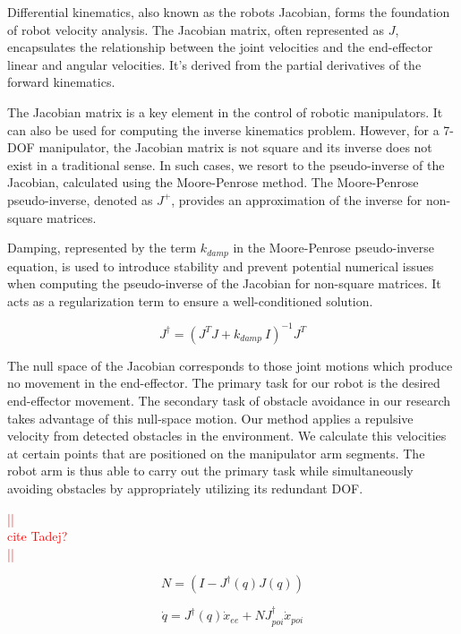 \documentclass[a4paper]{article}
\newcommand\todocomment[1]{\textcolor{red}{||\\ #1\\||}}
\begin{document}
Differential kinematics, also known as the robots Jacobian, forms the foundation of robot velocity analysis. The Jacobian matrix, often represented as $J$, encapsulates the relationship between the joint velocities and the end-effector linear and angular velocities. It's derived from the partial derivatives of the forward kinematics.

The Jacobian matrix is a key element in the control of robotic manipulators. It can also be used for computing the inverse kinematics problem. However, for a 7-DOF manipulator, the Jacobian matrix is not square and its inverse does not exist in a traditional sense. In such cases, we resort to the pseudo-inverse of the Jacobian, calculated using the Moore-Penrose method. The Moore-Penrose pseudo-inverse, denoted as $J^+$, provides an approximation of the inverse for non-square matrices. 

Damping, represented by the term $k_{damp}$ in the Moore-Penrose pseudo-inverse equation, is used to introduce stability and prevent potential numerical issues when computing the pseudo-inverse of the Jacobian for non-square matrices. It acts as a regularization term to ensure a well-conditioned solution.

\begin{equation}   	
	J^{\dagger} = (J^{T}J + k_{damp} ~I)^{-1}J^{T}
	\label{eq:moore_penrose}
\end{equation}
    
The null space of the Jacobian corresponds to those joint motions which produce no movement in the end-effector. The primary task for our robot is the desired end-effector movement. The secondary task of obstacle avoidance in our research takes advantage of this null-space motion. Our method applies a repulsive velocity from detected obstacles in the environment. We calculate this velocities at certain points that are positioned on the manipulator arm segments. The robot arm is thus able to carry out the primary task while simultaneously avoiding obstacles by appropriately utilizing its redundant DOF.

\todocomment{cite Tadej?}

\begin{equation}
	N = (I - J^{\dagger}(q)J(q))
	\label{eq:Null-Space}
\end{equation}

\begin{equation}
	\dot{q} = J^{\dagger}(q) \dot{x}_{ee} + N J^{\dagger}_{poi} \dot{x}_{poi}
	\label{eq:manipulator_kinematics}
\end{equation}
\end{document}
